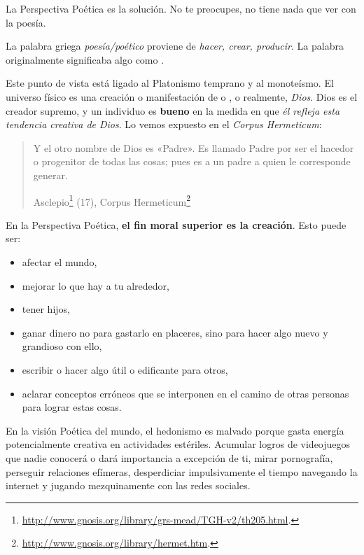 \documentclass{article}
\begin{document}
	La Perspectiva Poética es la solución. No te preocupes, no tiene nada
	que ver con la poesía.

	La palabra griega \textit{poesía/poético} proviene de \textit{hacer,
	crear, producir}. La palabra  originalmente
	significaba algo como .

	Este punto de vista está ligado al Platonismo temprano y al monoteísmo.
	El universo físico es una creación o manifestación de
	 o , o realmente,
	\textit{Dios}. Dios es el creador supremo, y un individuo es
	\textbf{bueno} en la medida en que \textit{él refleja esta tendencia
	creativa de Dios}. Lo vemos expuesto en el \textit{Corpus Hermeticum}:

	\blockquote[Asclepio\footnote{\url{http://www.gnosis.org/library/grs-mead/TGH-v2/th205.html}.}
	(17), Corpus Hermeticum\footnote{\url{http://www.gnosis.org/library/hermet.htm}.} \cite{uno}]
	{Y el otro nombre de Dios es «Padre». Es llamado Padre por ser el
	hacedor o progenitor de todas las cosas; pues es a un padre a quien le
	corresponde generar.}

	En la Perspectiva Poética, \textbf{el fin moral superior es la
	creación}. Esto puede ser:

	\begin{itemize}
	\item afectar el mundo,
	\item mejorar lo que hay a tu alrededor,
	\item tener hijos,
	\item ganar dinero no para gastarlo en placeres, sino para hacer algo
		nuevo y grandioso con ello,
	\end{itemize}

	\newpage

	\begin{itemize}
	\item escribir o hacer algo útil o edificante para otros,
	\item aclarar conceptos erróneos que se interponen en el camino de otras
	personas para lograr estas cosas.
	\end{itemize}

	En la visión Poética del mundo, el hedonismo es malvado porque gasta
	energía potencialmente creativa en actividades estériles. Acumular logros
	de videojuegos que nadie conocerá o dará importancia a excepción de ti,
	mirar pornografía, perseguir relaciones efímeras, desperdiciar
	impulsivamente el tiempo navegando la internet y jugando mezquinamente
	con las redes sociales.
\end{document}
